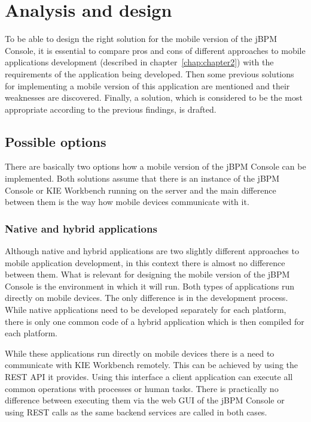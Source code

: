 \documentclass[12pt,oneside,final]{fithesis2}
\begin{document}
\chapter{Analysis and design}
To be able to design the right solution for the mobile version of the jBPM Console, it is essential to compare pros and cons of different approaches to mobile applications development (described in chapter~\ref{chap:chapter2}) with the requirements of the application being developed.
Then some previous solutions for implementing a mobile version of this application are mentioned and their weaknesses are discovered.
Finally, a solution, which is considered to be the most appropriate according to the previous findings, is drafted.

\section{Possible options}
There are basically two options how a mobile version of the jBPM Console can be implemented.
Both solutions assume that there is an instance of the jBPM Console or KIE Workbench running on the server and the main difference between them is the way how mobile devices communicate with it.

\subsection{Native and hybrid applications}
Although native and hybrid applications are two slightly different approaches to mobile application development, in this context there is almost no difference between them.
What is relevant for designing the mobile version of the jBPM Console is the environment in which it will run.
Both types of applications run directly on mobile devices.
The only difference is in the development process.
While native applications need to be developed separately for each platform, there is only one common code of a hybrid application which is then compiled for each platform.

While these applications run directly on mobile devices there is a need to communicate with KIE Workbench remotely.
This can be achieved by using the REST\footnotemark{} API it provides.
Using this interface a client application can execute all common operations with processes or human tasks.
There is practically no difference between executing them via the web GUI of the jBPM Console or using REST calls as the same backend services are called in both cases.
\end{document}

